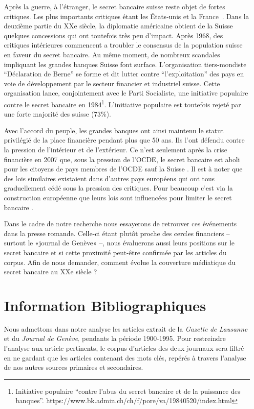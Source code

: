 \documentclass[11pt]{article}
\begin{document}
Après la guerre, à l'étranger, le secret bancaire suisse reste objet de
fortes critiques. Les plus importants critiques étant les États-unis et la
France~\citep[p. 503]{Mazbouri12}. Dans la deuxième partie du XXe siècle, la
diplomatie américaine obtient de la Suisse quelques concessions qui ont
toutefois très peu d'impact. Après 1968, des critiques intérieures commencent a
troubler le consensus de la population suisse en faveur du secret bancaire.
Au même moment, de nombreux scandales impliquant les grandes banques Suisse font 
surface. L’organisation tiers-mondiste “Déclaration de Berne” \citep{EvB} se forme et
dit lutter contre ``l'exploitation'' des pays en voie de développement par le
secteur financier et industriel suisse. Cette organisation lance, conjointement
avec le Parti Socialiste, une initiative populaire contre le secret bancaire en
1984\footnote{Initiative populaire ``contre l'abus du secret bancaire et de la
puissance des banques''.
https://www.bk.admin.ch/ch/f/pore/va/19840520/index.html}. L'initiative
populaire est toutefois rejeté par une forte majorité des suisse (73\%).

Avec l'accord du peuple, les grandes banques ont ainsi maintenu le
statut privilégié de la place financière pendant plus que 50 ans. Ils l’ont
défendu contre la pression de l’intérieur et de l’extérieur. Ce n’est
seulement après la crise financière en 2007 que, sous la pression de l'OCDE,
le secret bancaire est aboli pour les citoyens de pays membres de l'OCDE 
sauf la Suisse \citep{NeufVies}.
Il est à noter que des lois similaires existaient dans d'autres pays européens
qui ont tous graduellement cédé sous la pression des critiques. Pour beaucoup
c'est via la construction européenne que leurs lois sont influencées pour 
limiter le secret bancaire \citep[p. 32]{Palan09}. 

Dans le cadre de notre recherche nous essayerons de retrouver ces événements
dans la presse romande. Celle-ci étant plutôt proche des cercles financiers –
surtout le «journal de Genève» \citep{ConfClass1} –, nous évaluerons aussi
leurs positions sur le secret bancaire et si cette proximité peut-être
confirmée par les articles du corpus. Afin de nous demander, comment évolue la
couverture médiatique du secret bancaire au XXe siècle ? 

\section{Information Bibliographiques}

Nous admettons dans notre analyse les articles extrait de la \textit{Gazette de
Lausanne} et du \textit{Journal de Genève}, pendants la
période 1900-1995. Pour restreindre l’analyse aux article pertinents, le corpus
d’articles des deux journaux sera filtré en ne gardant que les articles
contenant des mots clés, repérés à travers l’analyse de nos autres sources
primaires et secondaires.
\end{document}
